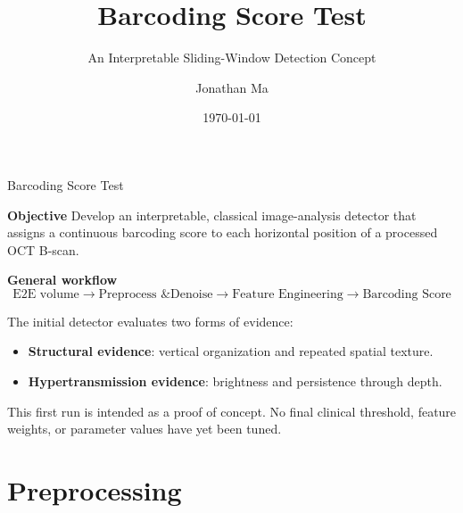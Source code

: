 \documentclass[aspectratio=169]{beamer}
\title{Barcoding Score Test}
\subtitle{An Interpretable Sliding-Window Detection Concept}
\author{Jonathan Ma}
\institute{Johns Hopkins University}
\date{\today}
\begin{document}

\begin{frame}
    \titlepage
\end{frame}


\begin{frame}{Barcoding Score Test}

\textbf{Objective}
Develop an interpretable, classical image-analysis detector that assigns a
continuous barcoding score to each horizontal position of a processed OCT
B-scan.
\vspace{0.4cm}

\textbf{General workflow}
\[
\text{E2E volume}
\rightarrow
\text{Preprocess \& Denoise}
\rightarrow
\text{Feature Engineering}
\rightarrow
\text{Barcoding Score}
\]

\vspace{0.4cm}

The initial detector evaluates two forms of evidence:

\begin{itemize}
    \item \textbf{Structural evidence}: vertical organization and repeated
    spatial texture.
    \item \textbf{Hypertransmission evidence}: brightness and persistence
    through depth.
\end{itemize}

\vspace{0.2cm}

This first run is intended as a proof of concept. No final clinical threshold,
feature weights, or parameter values have yet been tuned.

\end{frame}


\section{Preprocessing}
\end{document}
